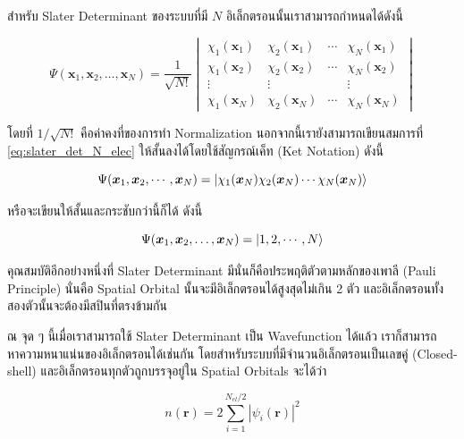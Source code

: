 สำหรับ Slater Determinant ของระบบที่มี $N$ อิเล็กตรอนนั้นเราสามารถกำหนดได้ดังนี้\autocite{szabo1996}

\begin{equation}\label{eq:slater_det_N_elec}
    \Psi(\bm{x}_{1}, \bm{x}_{2}, \dots, \bm{x}_{N}) =
    \frac{1}{\sqrt{N!}}
    \begin{vmatrix}
        \chi_{1}(\bm{x}_{1}) & \chi_{2}(\bm{x}_{1}) & \cdots & \chi_{N}(\bm{x}_{1}) \\
        \chi_{1}(\bm{x}_{2}) & \chi_{2}(\bm{x}_{2}) & \cdots & \chi_{N}(\bm{x}_{2}) \\
        \vdots               & \vdots               &        & \vdots               \\
        \chi_{1}(\bm{x}_{N}) & \chi_{2}(\bm{x}_{N}) & \cdots & \chi_{N}(\bm{x}_{N})
    \end{vmatrix}
\end{equation}

\noindent โดยที่ $1/\sqrt{N!}$ คือค่าคงที่ของการทำ Normalization นอกจากนี้เรายังสามารถเขียนสมการที่ \eqref{eq:slater_det_N_elec}
ให้สั้นลงได้โดยใช้สัญกรณ์เค็ท (Ket Notation) ดังนี้

\begin{equation}\label{eq:slater_det_ket}
    \Psi(\bm{x}_{1}, \bm{x}_{2}, \cdots, \bm{x}_{N}) =
    \ket{\chi_{1}(\bm{x}_{N}) \chi_{2}(\bm{x}_{N}) \cdots \chi_{N}(\bm{x}_{N})}
\end{equation}

\noindent หรือจะเขียนให้สั้นและกระชับกว่านี้ก็ได้ ดังนี้

\begin{equation}\label{eq:slater_det_ket_short}
    \Psi(\bm{x}_{1}, \bm{x}_{2}, \dots, \bm{x}_{N}) =
    \ket{1, 2, \cdots, N}
\end{equation}

คุณสมบัติอีกอย่างหนึ่งที่ Slater Determinant มีนั่นก็คือประพฤติตัวตามหลักของเพาลี (Pauli Principle) นั่นคือ Spatial Orbital
นั้นจะมีอิเล็กตรอนได้สูงสุดไม่เกิน 2 ตัว และอิเล็กตรอนทั้งสองตัวนั้นจะต้องมีสปินที่ตรงข้ามกัน\autocite{atkins2010}

ณ จุด ๆ นี้เมื่อเราสามารถใช้ Slater Determinant เป็น Wavefunction ได้แล้ว เราก็สามารถหาความหนาแน่นของอิเล็กตรอนได้เช่นกัน
โดยสำหรับระบบที่มีจำนวนอิเล็กตรอนเป็นเลขคู่ (Closed-shell) และอิเล็กตรอนทุกตัวถูกบรรจุอยู่ใน Spatial Orbitals จะได้ว่า

\begin{equation}\label{eq:density_slater}
    n(\bm{r}) = 2 \sum_{i=1}^{N_{el}/2} |\psi_{i}(\bm{r})|^{2}
\end{equation}

